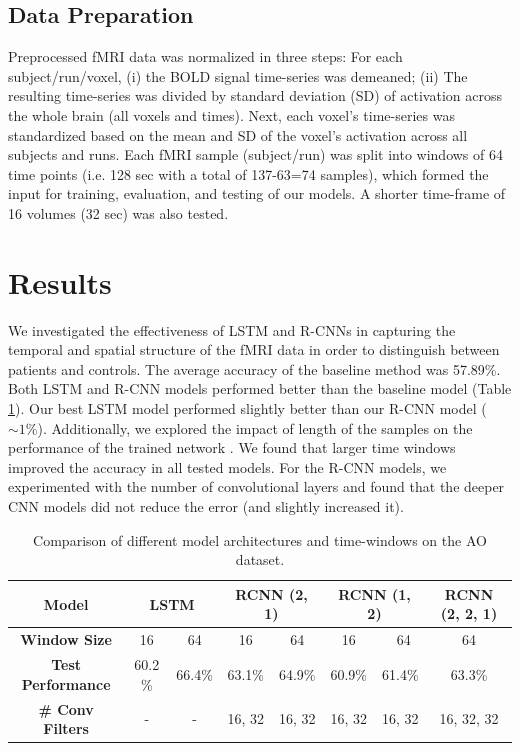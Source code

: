 \documentclass{article}
\begin{document}
\subsection{Data Preparation}

Preprocessed fMRI data was normalized in three steps: For each subject/run/voxel, (i) the BOLD signal time-series was demeaned; (ii) The resulting time-series was divided by standard deviation (SD) of activation across the whole brain (all voxels and times). Next, each voxel's time-series was standardized based on the mean and SD of the voxel's activation across all subjects and runs.
Each fMRI sample (subject/run) was split into windows of 64 time points (i.e. 128 sec with a total of 137-63=74 samples), which formed the input for training, evaluation, and testing of our models. A shorter time-frame of 16 volumes (32 sec) was also tested.

\section{Results}

We investigated the effectiveness of LSTM and R-CNNs in capturing the temporal and spatial structure of the fMRI data in order to distinguish between patients and controls. The average accuracy of the baseline method was 57.89\%. 
Both LSTM and R-CNN models performed better than the baseline model (Table \ref{table_1}). Our best LSTM model performed slightly better than our R-CNN model ($ \sim 1\%$). Additionally, we explored the impact of length of the samples on the performance of the trained network . We found that larger time windows improved the accuracy in all tested models. For the R-CNN models, we experimented with the number of convolutional layers and found that the deeper CNN models did not reduce the error (and slightly increased it).


\begin{table}[h]
\centering
\caption{Comparison of different model architectures and time-windows on the AO dataset.}
\label{table_1}
\begin{tabular}{ c c c c c c c c }
\hline
\textbf{Model}           & \multicolumn{2}{c}{\textbf{LSTM}} &
\multicolumn{2}{c}{\textbf{RCNN (2, 1)}} & \multicolumn{2}{c}{\textbf{RCNN (1, 2)}} & \textbf{RCNN (2, 2, 1)} \\ \hline
\textbf{Window Size}      & 16   & 64  & 16  & 64    &16    & \ 64    & 64           \\ \hline
\textbf{Test Performance} & 60.2 \%   & 66.4\%   & 63.1\% & 64.9\% & 60.9\%  & 61.4\%  & 63.3\%  \\  \hline
\textbf{\# Conv Filters}  & - & -   & 16, 32  & 16, 32 & 16, 32 & 16, 32 & 16, 32, 32 \\ \hline
\end{tabular}
\end{table}
\end{document}
